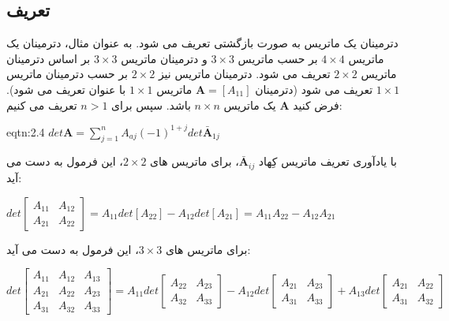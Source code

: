 
\subsection{\textbf{تعریف}}
\label{subsec:2.5.2}
{
    \Large
    \begin{spacing}{1.3}
        دترمینان یک ماتریس به صورت بازگشتی تعریف می شود.
        به عنوان مثال، دترمینان یک ماتریس $4\times 4$ بر حسب ماتریس $3\times 3$ و دترمینان ماتریس $3\times 3$ بر اساس دترمینان ماتریس $2\times 2$ تعریف می شود.
        دترمینان ماتریس نیز $2\times 2$ بر حسب دترمینان ماتریس $1\times 1$ تعریف می شود
        (دترمینان $\textbf{A}=[A_{11}]$ ماتریس $1\times 1$ با عنوان  تعریف می شود).
        فرض کنید $\textbf{A}$ یک ماتریس $n\times n$ باشد. سپس برای $n>1$ تعریف می کنیم:

        \begin{eqtn}{eqtn:2.4}
            \centering
            $det\textbf{A}=\sum\limits_{j=1}^{n}A_{aj}(-1)^{1+j}det\bar{\textbf{A}}_{1j}$
        \end{eqtn}

        با یادآوری تعریف ماتریس کِهاد $\bar{\textbf{A}}_{ij}$، برای ماتریس های $2\times 2$، این فرمول به دست می آید:

        \begin{center}
            $det\begin{bmatrix}
                    A_{11} & A_{12} \\
                    A_{21} & A_{22}
            \end{bmatrix}=A_{11}det[A_{22}]-A_{12}det[A_{21}]=A_{11}A_{22}-A_{12}A_{21}$
        \end{center}

        برای ماتریس های $3\times 3$، این فرمول به دست می آید:

        \begin{flushleft}
            $det\begin{bmatrix}
                    A_{11} & A_{12} & A_{13} \\
                    A_{21} & A_{22} & A_{23} \\
                    A_{31} & A_{32} & A_{33}
            \end{bmatrix}=A_{11}det\begin{bmatrix}
                                       A_{22} & A_{23} \\
                                       A_{32} & A_{33}
            \end{bmatrix}-A_{12}det\begin{bmatrix}
                                       A_{21} & A_{23} \\
                                       A_{31} & A_{33}
            \end{bmatrix}+A_{13}det\begin{bmatrix}
                                       A_{21} & A_{22} \\
                                       A_{31} & A_{32}
            \end{bmatrix}$
        \end{flushleft}


\end{spacing}}
